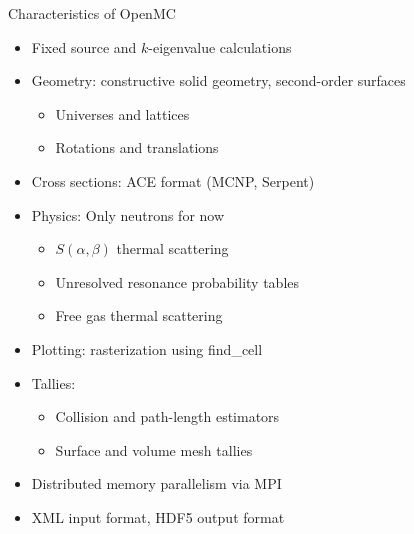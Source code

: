 \documentclass[serif]{beamer}
\begin{document}
\begin{frame}{Characteristics of OpenMC}
  \begin{itemize}
  \item<1-> Fixed source and $k$-eigenvalue calculations
  \item<1-> Geometry: constructive solid geometry, second-order surfaces
    \begin{itemize}
    \item<1-> Universes and lattices
    \item<1-> Rotations and translations
    \end{itemize}
  \item<1-> Cross sections: ACE format (MCNP, Serpent)
  \item<1-> Physics: Only neutrons for now
    \begin{itemize}
    \item<1-> $S(\alpha,\beta)$ thermal scattering
    \item<1-> Unresolved resonance probability tables
    \item<1-> Free gas thermal scattering
    \end{itemize}
  \item<1-> Plotting: rasterization using find\_cell
  \item<1-> Tallies:
    \begin{itemize}
    \item<1-> Collision and path-length estimators
    \item<1-> Surface and volume mesh tallies
    \end{itemize}
  \item<1-> Distributed memory parallelism via MPI
  \item<1-> XML input format, HDF5 output format
  \end{itemize}
\end{frame}

\end{document}
